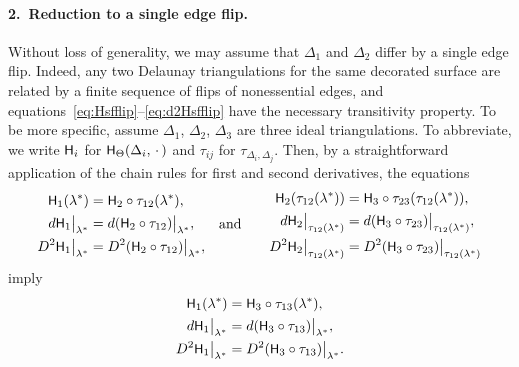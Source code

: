 \documentclass[a4paper, 11pt]{article}
\newcommand{\Hsf}{\scalebox{0.94}{$\mathsf{H}$}}
\theoremstyle{plain}
\theoremstyle{definition}
\begin{document}
\paragraph{2.~Reduction to a single edge flip.}
Without loss of generality, we may assume that $\Delta_{1}$ and
$\Delta_{2}$ differ by a single edge flip. Indeed, any two Delaunay
triangulations for the same decorated surface are related by a finite
sequence of flips of nonessential edges, and
equations~\eqref{eq:Hsfflip}--\eqref{eq:d2Hsfflip} have the necessary
transitivity property. To be more specific, assume $\Delta_{1}$,
$\Delta_{2}$, $\Delta_{3}$ are three ideal triangulations. To
abbreviate, we write $\Hsf_{i}$ for
$\Hsf_{\Theta}(\Delta_{i},\,\cdot\,)$ and $\tau_{ij}$ for
$\tau_{\Delta_{i},\Delta_{j}}$. Then, by a straightforward application
of the chain rules for first and second derivatives, the
equations
\begin{equation*}
\begin{aligned}
  \Hsf_{1}(\lambda^{*})&=\Hsf_{2}\circ\tau_{12}(\lambda^{*}),\\
  d\Hsf_{1}\big|_{\lambda^{*}}&=d(\Hsf_{2}\circ\tau_{12})\big|_{\lambda^{*}},\\
  D^{2}\Hsf_{1}\big|_{\lambda^{*}}&=D^{2}(\Hsf_{2}\circ\tau_{12})\big|_{\lambda^{*}},
\end{aligned}
\quad\text{and}\quad
\begin{aligned}
  \Hsf_{2}(\tau_{12}(\lambda^{*}))&=\Hsf_{3}\circ\tau_{23}(\tau_{12}(\lambda^{*})),\\
  d\Hsf_{2}\big|_{\tau_{12}(\lambda^{*})}&=d(\Hsf_{3}\circ\tau_{23})\big|_{\tau_{12}(\lambda^{*})},\\
  \quad
  D^{2}\Hsf_{2}\big|_{\tau_{12}(\lambda^{*})}&=D^{2}(\Hsf_{3}\circ\tau_{23})\big|_{\tau_{12}(\lambda^{*})}
\end{aligned}
\end{equation*}
imply
\begin{align*}
  \Hsf_{1}(\lambda^{*})&=\Hsf_{3}\circ\tau_{13}(\lambda^{*}),\\
  d\Hsf_{1}\big|_{\lambda^{*}}&=d(\Hsf_{3}\circ\tau_{13})\big|_{\lambda^{*}},\\
  D^{2}\Hsf_{1}\big|_{\lambda^{*}}&=D^{2}(\Hsf_{3}\circ\tau_{13})\big|_{\lambda^{*}}.
\end{align*}
\end{document}
